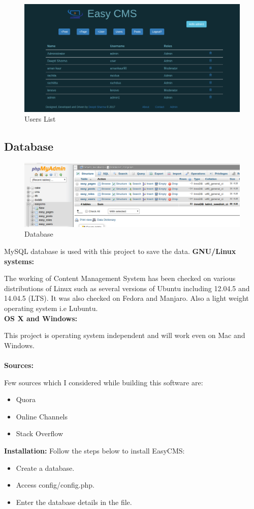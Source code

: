 \begin{figure}[h!]
	\centering \includegraphics[scale=.42]{input/images/new.png}
	\caption{Users List}
\end{figure}

\subsection{Database}
\begin{figure}[h!]
	\centering \includegraphics[scale=.45]{input/images/db.png}
	\caption{Database}
	\end{figure}

	MySQL database is used with this project to save the data.
\newpage
 \textbf{GNU/Linux systems:}
 
The working of Content Management System has been checked on various distributions of Linux such as several versions of Ubuntu including 12.04.5 and 14.04.5 (LTS). It was also checked on Fedora and Manjaro. Also a light weight operating system i.e Lubuntu.\\
 
 \textbf{OS X and Windows:}

 This project is operating system independent and will work even on Mac and Windows.\\\\

 
 \textbf{Sources:}
 
Few sources which I considered while building this software are:
\begin{itemize}
\item Quora
\item Online Channels
\item Stack Overflow
\end{itemize}

 \textbf{Installation:}
 Follow the steps below to install EasyCMS:
 \begin{itemize}
 	\item Create a database.
 	\item Access  config/config.php. 
 	\item Enter the database details in the file.
\end{itemize}



 
  

